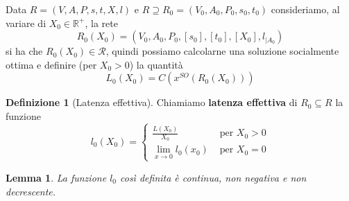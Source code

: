 \documentclass[a4paper]{article}
\theoremstyle{plain}
\newtheorem{mylem}[myteo]{Lemma}
\theoremstyle{definition}
\newtheorem{mydef}[myteo]{Definizione}
\theoremstyle{remark}
\newcommand{\pa}[1]{\left(#1\right)}
\newcommand{\bra}[1]{\left[#1\right]}
\begin{document}
Data $R=(V,A,P,s,t,X,l)$ e $R\supseteq R_0 =(V_0,A_0,P_0,s_0,t_0)$
consideriamo, al variare di $X_0\in \mathbb{R}^+$, la rete
\[ R_0\pa{X_0} = \pa{V_0,A_0,P_0,\bra{s_0},\bra{t_0},\bra{X_0},
    l_{\mid A_0}} \]
si ha che $R_0\pa{X_0}\in \mathcal{R}$, quindi possiamo calcolarne una
soluzione socialmente ottima e definire (per $X_0>0$) la quantità
\[ L_0\pa{X_0} = C\pa{x^{SO}\pa{R_0\pa{X_0}}} \]
\begin{mydef}[Latenza effettiva]
  Chiamiamo \textbf{latenza effettiva} di $R_0 \subseteq R$ la
  funzione
  \[ l_0\pa{X_0} = \left\{
      \begin{matrix}
        \frac{L\pa{X_0}}{X_0} & \text{ per } X_0 > 0 \\
        \lim _{x\to 0} l_0\pa{x_0} & \text{ per } X_0 = 0
      \end{matrix}
    \right. \]
\end{mydef}
\begin{mylem}
\label{lem:l0-regolare}
  La funzione $l_0$ così definita è continua, non negativa e non
  decrescente.
\end{mylem}
\end{document}
